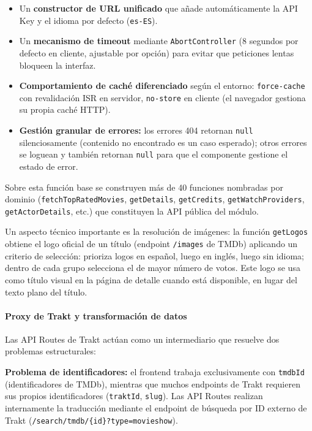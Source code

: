 \documentclass[
]{article}
\providecommand{\tightlist}{%
  \setlength{\itemsep}{0pt}\setlength{\parskip}{0pt}}
\begin{document}
\begin{itemize}
\tightlist
\item
  Un \textbf{constructor de URL unificado} que añade automáticamente la
  API Key y el idioma por defecto (\texttt{es-ES}).
\item
  Un \textbf{mecanismo de timeout} mediante \texttt{AbortController} (8
  segundos por defecto en cliente, ajustable por opción) para evitar que
  peticiones lentas bloqueen la interfaz.
\item
  \textbf{Comportamiento de caché diferenciado} según el entorno:
  \texttt{force-cache} con revalidación ISR en servidor,
  \texttt{no-store} en cliente (el navegador gestiona su propia caché
  HTTP).
\item
  \textbf{Gestión granular de errores:} los errores 404 retornan
  \texttt{null} silenciosamente (contenido no encontrado es un caso
  esperado); otros errores se loguean y también retornan \texttt{null}
  para que el componente gestione el estado de error.
\end{itemize}

Sobre esta función base se construyen más de 40 funciones nombradas por
dominio (\texttt{fetchTopRatedMovies}, \texttt{getDetails},
\texttt{getCredits}, \texttt{getWatchProviders},
\texttt{getActorDetails}, etc.) que constituyen la API pública del
módulo.

Un aspecto técnico importante es la resolución de imágenes: la función
\texttt{getLogos} obtiene el logo oficial de un título (endpoint
\texttt{/images} de TMDb) aplicando un criterio de selección: prioriza
logos en español, luego en inglés, luego sin idioma; dentro de cada
grupo selecciona el de mayor número de votos. Este logo se usa como
título visual en la página de detalle cuando está disponible, en lugar
del texto plano del título.

\hypertarget{proxy-de-trakt-y-transformaciuxf3n-de-datos}{%
\paragraph{Proxy de Trakt y transformación de
datos}\label{proxy-de-trakt-y-transformaciuxf3n-de-datos}}

Las API Routes de Trakt actúan como un intermediario que resuelve dos
problemas estructurales:

\textbf{Problema de identificadores:} el frontend trabaja exclusivamente
con \texttt{tmdbId} (identificadores de TMDb), mientras que muchos
endpoints de Trakt requieren sus propios identificadores
(\texttt{traktId}, \texttt{slug}). Las API Routes realizan internamente
la traducción mediante el endpoint de búsqueda por ID externo de Trakt
(\texttt{/search/tmdb/\{id\}?type=movie\textbar{}show}).
\end{document}
